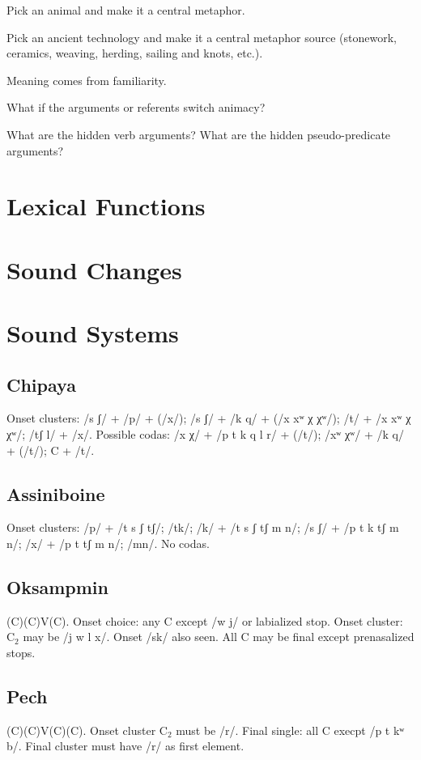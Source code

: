 \documentclass[11pt]{article}
\begin{document}
Pick an animal and make it a central metaphor.

Pick an ancient technology and make it a central metaphor source
(stonework, ceramics, weaving, herding, sailing and knots, etc.).

Meaning comes from familiarity.

What if the arguments or referents switch animacy?

What are the hidden verb arguments?  What are the hidden
pseudo-predicate arguments?


\section{Lexical Functions}


\section{Sound Changes}
{\small

}

\section{Sound Systems}

\subsection{Chipaya} Onset clusters: /s ʃ/ + /p/ + (/x/); /s ʃ/ + /k q/ +
(/x xʷ χ χʷ/); /t/ + /x xʷ χ χʷ/; /tʃ l/ + /x/.  Possible codas: /x χ/
+ /p t k q l r/ + (/t/); /xʷ χʷ/ + /k q/ + (/t/); C + /t/. 

\subsection{Assiniboine} Onset clusters: /p/ + /t s ʃ tʃ/; /tk/; /k/ +
/t s ʃ tʃ m n/; /s ʃ/ + /p t k tʃ m n/; /x/ + /p t tʃ m n/; /mn/.  No
codas. 

\subsection{Oksampmin} (C)(C)V(C).  Onset choice: any C except /w j/
or labialized stop.  Onset cluster: C$_{2}$ may be /j w l x/.  Onset
/sk/ also seen.  All C may be final except prenasalized stops.

\subsection{Pech} (C)(C)V(C)(C).  Onset cluster C$_{2}$ must be /r/.
Final single: all C execpt /p t kʷ b/.  Final cluster must have /r/ as
first element.
\end{document}
